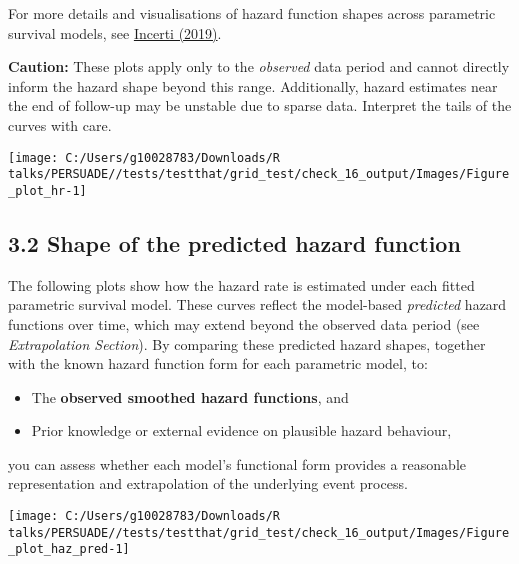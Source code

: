 \documentclass[
]{article}
\providecommand{\tightlist}{%
  \setlength{\itemsep}{0pt}\setlength{\parskip}{0pt}}
\begin{document}
For more details and visualisations of hazard function shapes across
parametric survival models, see
\href{https://devinincerti.com/2019/06/18/parametric_survival.html}{Incerti
(2019)}.

\textbf{Caution:} These plots apply only to the \emph{observed} data
period and cannot directly inform the hazard shape beyond this range.
Additionally, hazard estimates near the end of follow-up may be unstable
due to sparse data. Interpret the tails of the curves with care.

\clearpage

\begin{flushleft}\texttt{[image: C:/Users/g10028783/Downloads/R talks/PERSUADE//tests/testthat/grid\_test/check\_16\_output/Images/Figure\_plot\_hr-1]} \end{flushleft}

\clearpage

\subsection{3.2 Shape of the predicted hazard
function}\label{shape-of-the-predicted-hazard-function}

The following plots show how the hazard rate is estimated under each
fitted parametric survival model. These curves reflect the model-based
\emph{predicted} hazard functions over time, which may extend beyond the
observed data period (see \emph{Extrapolation Section}). By comparing
these predicted hazard shapes, together with the known hazard function
form for each parametric model, to:

\begin{itemize}
\tightlist
\item
  The \textbf{observed smoothed hazard functions}, and\\
\item
  Prior knowledge or external evidence on plausible hazard behaviour,
\end{itemize}

you can assess whether each model's functional form provides a
reasonable representation and extrapolation of the underlying event
process.

\clearpage

\begin{flushleft}\texttt{[image: C:/Users/g10028783/Downloads/R talks/PERSUADE//tests/testthat/grid\_test/check\_16\_output/Images/Figure\_plot\_haz\_pred-1]} \end{flushleft}
\end{document}
